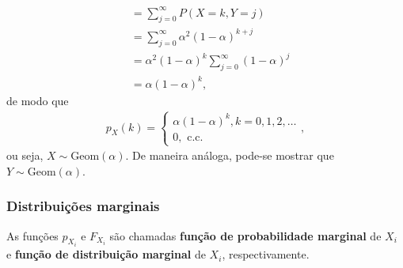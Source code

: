 \documentclass[../Notas.tex]{subfiles}
\begin{document}
\begin{example}
\begin{align*}
           &= \sum_{j=0}^{\infty} P(X=k, Y=j) \\
           &= \sum_{j=0}^{\infty} \alpha^2(1-\alpha)^{k+j} \\
           &= \alpha^2(1-\alpha)^k\sum_{j=0}^{\infty}(1-\alpha)^j \\
           &= \alpha(1-\alpha)^k,
\end{align*}
de modo que
\begin{align*}
    p_X(k) = \begin{cases}
    \alpha(1-\alpha)^k, k = 0,1,2,\dots \\
    0, \text{ c.c.}
    \end{cases},
\end{align*}
ou seja, $X\sim\text{Geom}(\alpha)$. De maneira análoga, pode-se mostrar que $Y\sim\text{Geom}(\alpha)$.
\end{example}

\subsubsection{Distribuições marginais}
As funções $p_{X_i}$ e $F_{X_i}$ são chamadas \textbf{função de probabilidade marginal} de $X_i$ e \textbf{função de distribuição marginal} de $X_i$, respectivamente.
\end{document}
